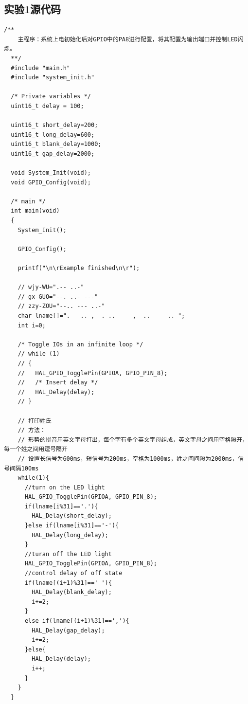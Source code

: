 ﻿\documentclass[UTF8,12pt]{article}
\begin{document}
\subsection{实验1源代码}
\begin{lstlisting}[frame=shadowbox]
    /**
    主程序：系统上电初始化后对GPIO中的PA8进行配置，将其配置为输出端口并控制LED闪烁。
  **/
  #include "main.h"
  #include "system_init.h"
  
  /* Private variables */
  uint16_t delay = 100;
  
  uint16_t short_delay=200;
  uint16_t long_delay=600;
  uint16_t blank_delay=1000;
  uint16_t gap_delay=2000;
  
  void System_Init(void);
  void GPIO_Config(void);
  
  /* main */
  int main(void)
  {
    System_Init();
    
    GPIO_Config();
    
    printf("\n\rExample finished\n\r");
  
    // wjy-WU=".-- ..-"
    // gx-GUO="--. ..- ---"
    // zzy-ZOU="--.. --- ..-"
    char lname[]=".-- ..-,--. ..- ---,--.. --- ..-";
    int i=0;
  
    /* Toggle IOs in an infinite loop */
    // while (1)
    // {
    //   HAL_GPIO_TogglePin(GPIOA, GPIO_PIN_8);
    //   /* Insert delay */
    //   HAL_Delay(delay);
    // }
  
    // 打印姓氏
    // 方法：
    // 形势的拼音用英文字母打出，每个字有多个英文字母组成，英文字母之间用空格隔开，每一个姓之间用逗号隔开
    // 设置长信号为600ms，短信号为200ms，空格为1000ms，姓之间间隔为2000ms，信号间隔100ms
    while(1){
      //turn on the LED light
      HAL_GPIO_TogglePin(GPIOA, GPIO_PIN_8);
      if(lname[i%31]=='.'){
        HAL_Delay(short_delay);
      }else if(lname[i%31]=='-'){
        HAL_Delay(long_delay);
      }
      //turan off the LED light
      HAL_GPIO_TogglePin(GPIOA, GPIO_PIN_8);
      //control delay of off state
      if(lname[(i+1)%31]==' '){
        HAL_Delay(blank_delay);
        i+=2;
      }
      else if(lname[(i+1)%31]==','){
        HAL_Delay(gap_delay);
        i+=2;
      }else{
        HAL_Delay(delay);
        i++;
      }
    }
  }  
\end{lstlisting}

\newpage
\end{document}
